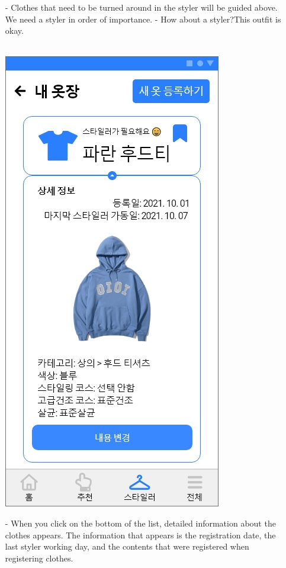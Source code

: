 \documentclass[conference]{IEEEtran}
\begin{document}
\begin{enumerate}
\begin{enumerate}
 \item[-]Clothes that need to be turned around in the styler will be guided above. We need a styler in order of importance. - How about a styler?This outfit is okay. \\\\
 \centerline{\includegraphics[scale=0.32]{assets/내 옷장2.jpg}}
 \item[-] When you click on the bottom of the list, detailed information about the clothes appears. The information that appears is the registration date, the last styler working day, and the contents that were registered when registering clothes.\\\\
 \end{enumerate}
 

\end{enumerate}
\end{document}
